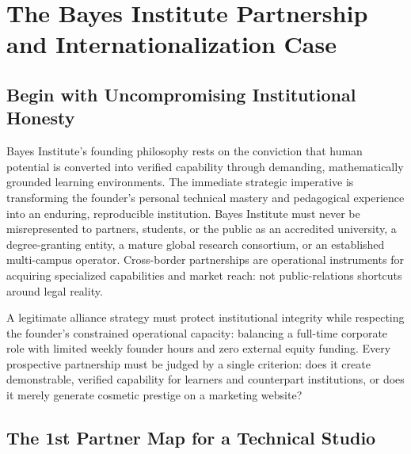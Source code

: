 \section{The Bayes Institute Partnership and Internationalization Case}
\label{sec:ch30_bayes_institute_case}

\subsection{Begin with Uncompromising Institutional Honesty}
\label{sec:institutional_honesty_baseline}

Bayes Institute's founding philosophy rests on the conviction that human potential is converted into verified capability through demanding, mathematically grounded learning environments. The immediate strategic imperative is transforming the founder's personal technical mastery and pedagogical experience into an enduring, reproducible institution. Bayes Institute must never be misrepresented to partners, students, or the public as an accredited university, a degree-granting entity, a mature global research consortium, or an established multi-campus operator. Cross-border partnerships are operational instruments for acquiring specialized capabilities and market reach: not public-relations shortcuts around legal reality.

A legitimate alliance strategy must protect institutional integrity while respecting the founder's constrained operational capacity: balancing a full-time corporate role with limited weekly founder hours and zero external equity funding. Every prospective partnership must be judged by a single criterion: does it create demonstrable, verified capability for learners and counterpart institutions, or does it merely generate cosmetic prestige on a marketing website?

\subsection{The 1st Partner Map for a Technical Studio}
\label{sec:first_partner_map_technical_studio}

